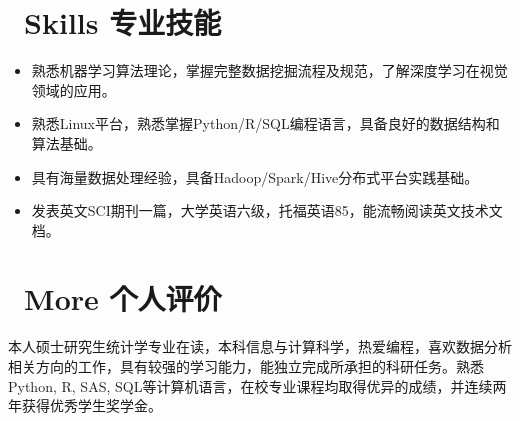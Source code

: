 \documentclass{resume}
\begin{document}
	\section{\faCogs\ Skills 专业技能}
	\begin{itemize}[parsep=0.5ex]
		\item 熟悉机器学习算法理论，掌握完整数据挖掘流程及规范，了解深度学习在视觉领域的应用。
		\item 熟悉Linux平台，熟悉掌握Python/R/SQL编程语言，具备良好的数据结构和算法基础。
		\item 具有海量数据处理经验，具备Hadoop/Spark/Hive分布式平台实践基础。
		\item 发表英文SCI期刊一篇，大学英语六级，托福英语85，能流畅阅读英文技术文档。
	\end{itemize}
	
	
	\section{\faInfo\ More 个人评价}
	本人硕士研究生统计学专业在读，本科信息与计算科学，热爱编程，喜欢数据分析相关方向的工作，具有较强的学习能力，能独立完成所承担的科研任务。熟悉Python, R, SAS, SQL等计算机语言，在校专业课程均取得优异的成绩，并连续两年获得优秀学生奖学金。
	
\end{document}

